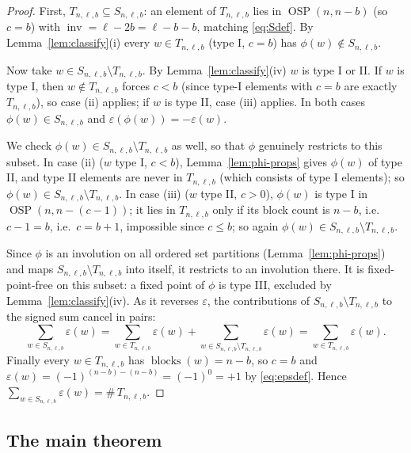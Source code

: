 \documentclass[11pt]{amsart}
\theoremstyle{definition}
\DeclareMathOperator{\OSP}{OSP}
\DeclareMathOperator{\inv}{inv}
\DeclareMathOperator{\blocks}{blocks}
\begin{document}
\begin{proof}
First, $T_{n,\ell,b}\subseteq S_{n,\ell,b}$: an element of $T_{n,\ell,b}$ lies in
$\OSP(n,n-b)$ (so $c=b$) with $\inv=\ell-2b=\ell-b-b$, matching \eqref{eq:Sdef}.
By Lemma~\ref{lem:classify}(i) every $w\in T_{n,\ell,b}$ (type I, $c=b$) has
$\phi(w)\notin S_{n,\ell,b}$.

Now take $w\in S_{n,\ell,b}\setminus T_{n,\ell,b}$. By
Lemma~\ref{lem:classify}(iv) $w$ is type I or II. If $w$ is type I, then $w\notin
T_{n,\ell,b}$ forces $c<b$ (since type-I elements with $c=b$ are exactly
$T_{n,\ell,b}$), so case (ii) applies; if $w$ is type II, case (iii) applies. In
both cases $\phi(w)\in S_{n,\ell,b}$ and $\varepsilon(\phi(w))=-\varepsilon(w)$.

We check $\phi(w)\in S_{n,\ell,b}\setminus T_{n,\ell,b}$ as well, so that $\phi$
genuinely restricts to this subset. In case (ii) ($w$ type I, $c<b$),
Lemma~\ref{lem:phi-props} gives $\phi(w)$ of type II, and type II elements are
never in $T_{n,\ell,b}$ (which consists of type I elements); so
$\phi(w)\in S_{n,\ell,b}\setminus T_{n,\ell,b}$. In case (iii) ($w$ type II,
$c>0$), $\phi(w)$ is type I in $\OSP(n,n-(c-1))$; it lies in $T_{n,\ell,b}$ only
if its block count is $n-b$, i.e.\ $c-1=b$, i.e.\ $c=b+1$, impossible since
$c\le b$; so again $\phi(w)\in S_{n,\ell,b}\setminus T_{n,\ell,b}$.

Since $\phi$ is an involution on all ordered set partitions
(Lemma~\ref{lem:phi-props}) and maps
$S_{n,\ell,b}\setminus T_{n,\ell,b}$ into itself, it restricts to an involution
there. It is fixed-point-free on this subset: a fixed point of $\phi$ is type III,
excluded by Lemma~\ref{lem:classify}(iv). As it reverses $\varepsilon$, the
contributions of $S_{n,\ell,b}\setminus T_{n,\ell,b}$ to the signed sum cancel in
pairs:
\begin{equation}
\sum_{w\in S_{n,\ell,b}}\varepsilon(w)
=\sum_{w\in T_{n,\ell,b}}\varepsilon(w)
+\sum_{w\in S_{n,\ell,b}\setminus T_{n,\ell,b}}\varepsilon(w)
=\sum_{w\in T_{n,\ell,b}}\varepsilon(w).
\end{equation}
Finally every $w\in T_{n,\ell,b}$ has $\blocks(w)=n-b$, so $c=b$ and
$\varepsilon(w)=(-1)^{(n-b)-(n-b)}=(-1)^0=+1$ by \eqref{eq:epsdef}. Hence
$\sum_{w\in S_{n,\ell,b}}\varepsilon(w)=\#\,T_{n,\ell,b}$.
\end{proof}

\subsection{The main theorem}
\end{document}
